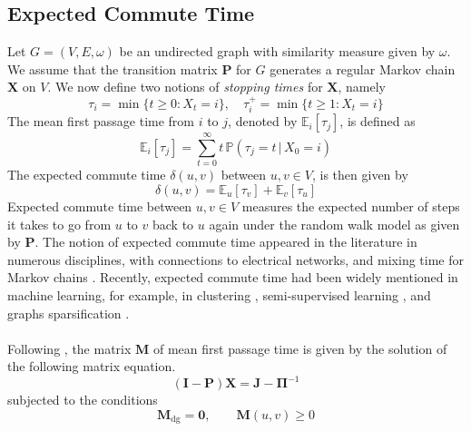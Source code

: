 \documentclass[10pt,twocolumn]{article}
\numberwithin{equation}{section}
\begin{document}
\subsection{Expected Commute Time}
\label{sec:expect-comm-time}
Let $G = (V,E,\omega)$ be an undirected graph with similarity measure
given by $\omega$. We assume that the transition matrix $\mathbf{P}$
for $G$ generates a regular Markov chain $\mathbf{X}$ on $V$. We now
define two notions of {\em stopping times} for $\mathbf{X}$, namely
\begin{equation*}
  \tau_i = \min\{ t \geq 0 \colon X_t = i \}, \quad \tau_i^{+} = \min
  \{ t \geq 1 \colon X_t = i \}
\end{equation*}
The mean first passage time from $i$ to $j$, denoted by
$\mathbb{E}_{i}[\tau_j]$, is defined as
\begin{equation}
  \label{eq:6}
  \mathbb{E}_{i}[\tau_j] = \sum_{t = 0}^{\infty}{t \, \mathbb{P}(\tau_j =
    t \,|\, X_0 = i)}
\end{equation}
The expected commute time $\delta(u,v)$ between $u,v \in V$, is
then given by
\begin{equation}
  \label{eq:5}
  \delta(u,v) = \mathbb{E}_{u}[\tau_v] + \mathbb{E}_{v}[\tau_u] 
\end{equation}
Expected commute time between $u,v \in V$ measures the expected number
of steps it takes to go from $u$ to $v$ back to $u$ again under the
random walk model as given by $\mathbf{P}$. The notion of expected
commute time appeared in the literature in numerous disciplines, with
connections to electrical networks,
\cite{doyle84:_random_walks_elect_networ} and mixing time for Markov
chains
\cite{lovasz96:_random_graph,levin09:_markov_chain_mixin_times}.
Recently, expected commute time had been widely mentioned in machine
learning, for example, in clustering
\cite{saerens04,yen07:_graph,qui07:_clust}, semi-supervised learning
\cite{szummer01:_partial_markov,zhou04:_learn,zhou04:_learn_label_unlab,zhu03:_semi_super_learn_using_gauss},
and graphs sparsification \cite{spielmand08:_graph}. \\ \\
\noindent
Following \cite{kemeny83:_finit_markov_chain}, the matrix
$\mathbf{M}$ of mean first passage time is given by the
solution of the following matrix equation.
\begin{equation}
  \label{eq:14}
  (\mathbf{I} - \mathbf{P})\mathbf{X} = \mathbf{J} - \bm{\Pi}^{-1}
\end{equation}
subjected to the conditions 
\begin{equation}
  \label{eq:7}
  \mathbf{M}_{\mathrm{dg}} = \mathbf{0}, \qquad \mathbf{M}(u,v) \geq 0   
\end{equation}
\end{document}

